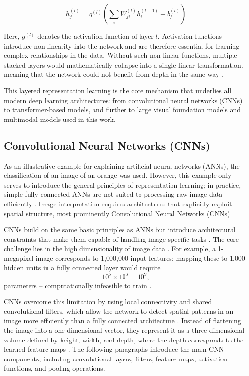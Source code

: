 \begin{equation}
h^{(l)}_{j} =
g^{(l)}\left(
\sum_i W^{(l)}_{ji} h^{(l-1)}_i + b^{(l)}_j
\right)
\label{eq:neuron_forward_pass}
\end{equation}

Here, $g^{(l)}$ denotes the activation function of layer $l$. Activation functions introduce non-linearity into the network and are therefore essential for learning complex relationships in the data. Without such non-linear functions, multiple stacked layers would mathematically collapse into a single linear transformation, meaning that the network could not benefit from depth in the same way \citep{chollet2018deep, Montesinos2022Multivariate}.

This layered representation learning is the core mechanism that underlies all modern deep learning architectures: from convolutional neural networks (CNNs) to transformer-based models, and further to large visual foundation models and multimodal models used in this work.


\subsection{Convolutional Neural Networks (CNNs)}
\label{sec:cnn_foundations}

As an illustrative example for explaining artificial neural networks (ANNs), the classification of an image of an orange was used. However, this example only serves to introduce the general principles of representation learning; in practice, simple fully connected ANNs are not suited to processing raw image data efficiently \citep{o2015introduction}. Image interpretation requires architectures that explicitly exploit spatial structure, most prominently Convolutional Neural Networks (CNNs) \citep{o2015introduction, Li2021Asurvey}.

CNNs build on the same basic principles as ANNs but introduce architectural constraints that make them capable of handling image-specific tasks \citep{o2015introduction}. The core challenge lies in the high dimensionality of image data \citep{zhang2023dive}. For example, a 1-megapixel image corresponds to 1{,}000{,}000 input features; mapping these to 1{,}000 hidden units in a fully connected layer would require
\begin{equation*}
10^{6} \times 10^{3} = 10^{9},
\end{equation*}
parameters -- computationally infeasible to train \citep{zhang2023dive}.

CNNs overcome this limitation by using local connectivity and shared convolutional filters, which allow the network to detect spatial patterns in an image more efficiently than a fully connected architecture \citep{o2015introduction, Li2021Asurvey}.
Instead of flattening the image into a one-dimensional vector, they represent it as a three-dimensional volume defined by height, width, and depth, where the depth corresponds to the learned feature maps \citep{o2015introduction}. The following paragraphs introduce the main CNN components, including convolutional layers, filters, feature maps, activation functions, and pooling operations.

